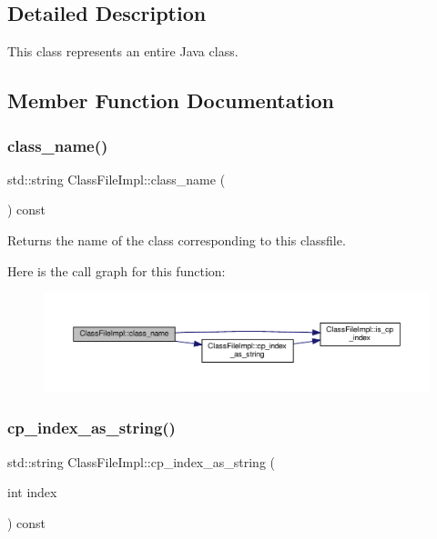 \subsection{Detailed Description}
This class represents an entire Java class. 

\subsection{Member Function Documentation}
\mbox{\label{classClassFileImpl_a6b505e3750863370ca70c708d051a00c}} 
\subsubsection{\texorpdfstring{class\+\_\+name()}{class\_name()}}
{\footnotesize\ttfamily std\+::string Class\+File\+Impl\+::class\+\_\+name (\begin{DoxyParamCaption}{ }\end{DoxyParamCaption}) const}



Returns the name of the class corresponding to this classfile. 

Here is the call graph for this function\+:
\nopagebreak
\begin{figure}[H]
\begin{center}
\leavevmode
\includegraphics[width=350pt]{classClassFileImpl_a6b505e3750863370ca70c708d051a00c_cgraph}
\end{center}
\end{figure}
\mbox{\label{classClassFileImpl_abf8923075c93d6d5bd1755a7b3ced362}} 
\subsubsection{\texorpdfstring{cp\+\_\+index\+\_\+as\+\_\+string()}{cp\_index\_as\_string()}}
{\footnotesize\ttfamily std\+::string Class\+File\+Impl\+::cp\+\_\+index\+\_\+as\+\_\+string (\begin{DoxyParamCaption}\item[{int}]{index }\end{DoxyParamCaption}) const}

